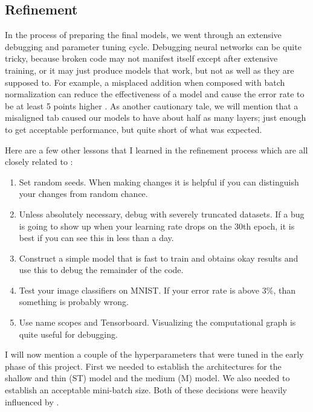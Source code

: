\documentclass[english,a4paper,oneside]{amsart}
\theoremstyle{definition}
\begin{document}

\subsection{Refinement}
In the process of preparing the final models, we went through an extensive debugging and parameter tuning cycle. Debugging neural networks can be quite tricky, because broken code may not manifest itself except after extensive training, or it may just produce models that work, but not as well as they are supposed to. For example, a misplaced addition when composed with batch normalization can reduce the effectiveness of a model and cause the error rate to be at least 5 points higher \cite{Preactive}.  As another cautionary tale, we will mention that a misaligned tab caused our models to have about half as many layers; just enough to get acceptable performance, but quite short of what was expected. 

Here are a few other lessons that I learned in the refinement process which are all closely related to :
\begin{enumerate}
	\item Set random seeds. When making changes it is helpful if you can distinguish your changes from random chance.
	\item Unless absolutely necessary, debug with severely truncated datasets. If a bug is going to show up when your learning rate drops on the 30th epoch, it is best if you can see this in less than a day.
	\item Construct a simple model that is fast to train and obtains okay results and use this to debug the remainder of the code.
	\item Test your image classifiers on MNIST. If your error rate is above 3\%, than something is probably wrong.
	\item Use name scopes and Tensorboard. Visualizing the computational graph is quite useful for debugging. 
\end{enumerate}

I will now mention a couple of the hyperparameters that were tuned in the early phase of this project. First we needed to establish the architectures for the shallow and thin (ST) model and the medium (M) model. We also needed to establish an acceptable mini-batch size. Both of these decisions were heavily influenced by .
\end{document}
